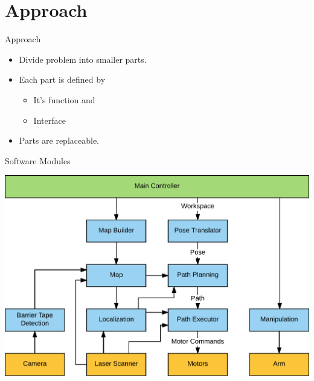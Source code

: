 
\section{Approach}
\begin{frame}{Approach}
    \begin{itemize}
        \item Divide problem into smaller parts.
        \item Each part is defined by
        \begin{itemize}
            \item It's function and
            \item Interface
        \end{itemize}
        \item Parts are replaceable.
    \end{itemize}
\end{frame}
\begin{frame}{Software Modules}
    \begin{center}
        \includegraphics[width=\linewidth,height=0.9\textheight,keepaspectratio]{gfx/software_modules.pdf}
    \end{center}
\end{frame}